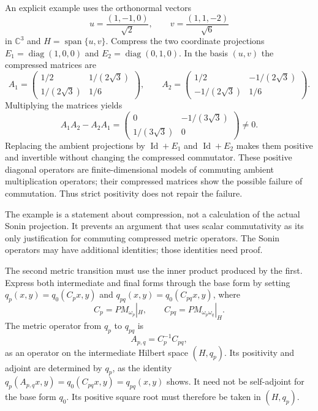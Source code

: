 \documentclass[11pt,letterpaper]{article}
\theoremstyle{definition}
\theoremstyle{remark}
\newcommand{\C}{\mathbb C}
\newcommand{\Id}{\operatorname{Id}}
\newcommand{\Span}{\operatorname{span}}
\begin{document}
An explicit example uses the orthonormal vectors
\[
 u=\frac{(1,-1,0)}{\sqrt2},\qquad
 v=\frac{(1,1,-2)}{\sqrt6}
\]
in $\C^3$ and $H=\Span\{u,v\}$. Compress the two coordinate
projections $E_1=\operatorname{diag}(1,0,0)$ and
$E_2=\operatorname{diag}(0,1,0)$. In the basis $(u,v)$ the
compressed matrices are
\begin{equation}
 A_1=\begin{pmatrix}1/2&1/(2\sqrt3)\\1/(2\sqrt3)&1/6\end{pmatrix},
 \qquad
 A_2=\begin{pmatrix}1/2&-1/(2\sqrt3)\\-1/(2\sqrt3)&1/6\end{pmatrix}.
 \label{eq:compressed-matrices}
\end{equation}
Multiplying the matrices yields
\begin{equation}
 A_1A_2-A_2A_1=
 \begin{pmatrix}0&-1/(3\sqrt3)\\1/(3\sqrt3)&0\end{pmatrix}\ne0.
 \label{eq:matrix-commutator}
\end{equation}
Replacing the ambient projections by $\Id+E_1$ and
$\Id+E_2$ makes them positive and invertible without changing
the compressed commutator. These positive diagonal operators
are finite-dimensional models of commuting ambient multiplication
operators; their compressed matrices show the possible failure
of commutation. Thus strict positivity does not repair the failure.

The example is a statement about compression, not a calculation
of the actual Sonin projection. It prevents an argument that
uses scalar commutativity as its only justification for
commuting compressed metric operators. The Sonin operators
may have additional identities; those identities need proof.

The second metric transition must use the inner product
produced by the first. Express both intermediate and final
forms through the base form by setting
$q_p(x,y)=q_0(C_px,y)$ and
$q_{pq}(x,y)=q_0(C_{pq}x,y)$, where
\[
 C_p=PM_{\omega_p}|_H,\qquad
 C_{pq}=PM_{\omega_p\omega_q}|_H.
\]
The metric operator from $q_p$ to $q_{pq}$ is
\begin{equation}
 A_{p,q}=C_p^{-1}C_{pq},
 \label{eq:relative-metric}
\end{equation}
as an operator on the intermediate Hilbert space $(H,q_p)$.
Its positivity and adjoint are determined by $q_p$, as the identity
$q_p(A_{p,q}x,y)=q_0(C_{pq}x,y)=q_{pq}(x,y)$
shows. It need not be self-adjoint for the base form $q_0$.
Its positive square root must therefore be taken in $(H,q_p)$.
\end{document}
